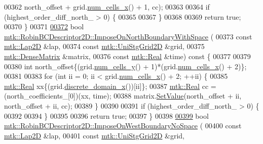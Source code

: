 \begin{DoxyCode}
00362                   north\_offset + grid.\hyperlink{classmtk_1_1UniStgGrid2D_a2d182866a398aba8e4829590e85bf939}{num\_cells\_x}() + 1, cc);
00363 
00364   \textcolor{keywordflow}{if} (highest\_order\_diff\_north\_ > 0) \{
00365 
00367   \}
00368 
00369   \textcolor{keywordflow}{return} \textcolor{keyword}{true};
00370 \}
00371 
\hypertarget{mtk__robin__bc__descriptor__2d_8cc_source_l00372}{}\hyperlink{classmtk_1_1RobinBCDescriptor2D_afdf9cc19481303564a17c8c7157d57cb}{00372} \textcolor{keywordtype}{bool} \hyperlink{classmtk_1_1RobinBCDescriptor2D_afdf9cc19481303564a17c8c7157d57cb}{mtk::RobinBCDescriptor2D::ImposeOnNorthBoundaryWithSpace}
      (
00373     \textcolor{keyword}{const} \hyperlink{classmtk_1_1Lap2D}{mtk::Lap2D} &lap,
00374     \textcolor{keyword}{const} \hyperlink{classmtk_1_1UniStgGrid2D}{mtk::UniStgGrid2D} &grid,
00375     \hyperlink{classmtk_1_1DenseMatrix}{mtk::DenseMatrix} &matrix,
00376     \textcolor{keyword}{const} \hyperlink{group__c01-roots_gac080bbbf5cbb5502c9f00405f894857d}{mtk::Real} &time)\textcolor{keyword}{ const }\{
00377 
00379 
00380   \textcolor{keywordtype}{int} north\_offset\{(grid.\hyperlink{classmtk_1_1UniStgGrid2D_aed05a801cc9a76dba0ff203cea58a61a}{num\_cells\_y}() + 1)*(grid.\hyperlink{classmtk_1_1UniStgGrid2D_a2d182866a398aba8e4829590e85bf939}{num\_cells\_x}() + 2)\};
00381 
00383   \textcolor{keywordflow}{for} (\textcolor{keywordtype}{int} ii = 0; ii < grid.\hyperlink{classmtk_1_1UniStgGrid2D_a2d182866a398aba8e4829590e85bf939}{num\_cells\_x}() + 2; ++ii) \{
00385     \hyperlink{group__c01-roots_gac080bbbf5cbb5502c9f00405f894857d}{mtk::Real} xx\{(grid.\hyperlink{classmtk_1_1UniStgGrid2D_ab2f70cf5cd0a2d5486992d9f2f8baa4a}{discrete\_domain\_x}())[ii]\};
00387     \hyperlink{group__c01-roots_gac080bbbf5cbb5502c9f00405f894857d}{mtk::Real} cc = (north\_coefficients\_[0])(xx, time);
00388     matrix.\hyperlink{classmtk_1_1DenseMatrix_a784ce5784109ac86bfb9d8562b334b13}{SetValue}(north\_offset + ii, north\_offset + ii, cc);
00389   \}
00390 
00391   \textcolor{keywordflow}{if} (highest\_order\_diff\_north\_ > 0) \{
00392 
00394   \}
00395 
00396   \textcolor{keywordflow}{return} \textcolor{keyword}{true};
00397 \}
00398 
\hypertarget{mtk__robin__bc__descriptor__2d_8cc_source_l00399}{}\hyperlink{classmtk_1_1RobinBCDescriptor2D_af5dd24444e7eb14592a3c3feaf30d561}{00399} \textcolor{keywordtype}{bool} \hyperlink{classmtk_1_1RobinBCDescriptor2D_af5dd24444e7eb14592a3c3feaf30d561}{mtk::RobinBCDescriptor2D::ImposeOnWestBoundaryNoSpace}
      (
00400     \textcolor{keyword}{const} \hyperlink{classmtk_1_1Lap2D}{mtk::Lap2D} &lap,
00401     \textcolor{keyword}{const} \hyperlink{classmtk_1_1UniStgGrid2D}{mtk::UniStgGrid2D} &grid,

\end{DoxyCode}
